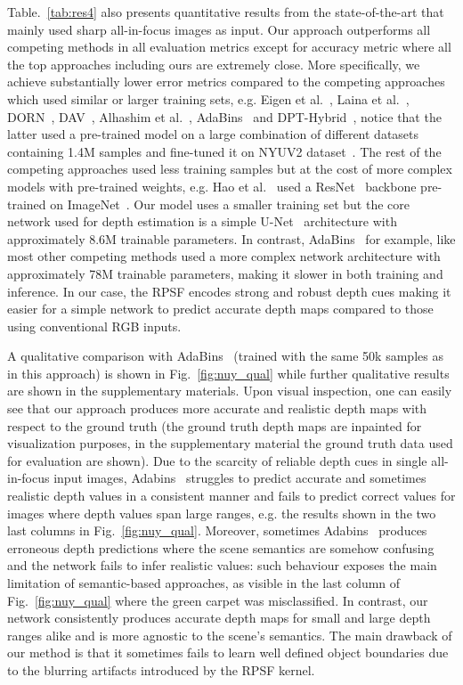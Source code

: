 \documentclass[preprint,5p,twocolumn]{elsarticle}
\begin{document}
Table.~\ref{tab:res4} also presents  quantitative results from the state-of-the-art that mainly used sharp all-in-focus images as input. Our approach outperforms all competing methods in all evaluation metrics except for  accuracy metric where all the top approaches including ours are extremely close. More specifically, we achieve substantially lower error metrics compared to the competing approaches which used similar or larger training sets, e.g. Eigen et al.~\cite{eigen2015predicting}, Laina et al.~\cite{laina2016deeper}, DORN~\cite{fu2018deep}, DAV~\cite{huynh2020guiding}, Alhashim et al.~\cite{alhashim2018high},  AdaBins~\cite{bhat2020adabins} and DPT-Hybrid~\cite{ranftl2021vision}, notice that the latter used a pre-trained model on a large combination of different datasets containing 1.4M samples and fine-tuned it on NYUV2 dataset~\cite{eigen2015predicting}. The rest of the competing approaches used less training samples but at the cost of more complex models with pre-trained weights, e.g. Hao et al.~\cite{hao2018detail} used a ResNet~\cite{he2016deep} backbone pre-trained on ImageNet~\cite{deng2009imagenet}.
Our model uses a smaller training set but the core network used for depth estimation is a simple U-Net~\cite{ronneberger2015u} architecture with approximately 8.6M trainable parameters. In contrast, AdaBins~\cite{bhat2020adabins} for example, like most other competing methods used a more complex network architecture with approximately 78M trainable parameters, making it slower in both training and inference. In our case, the RPSF encodes strong and robust depth cues making it easier for a simple network to predict accurate depth maps compared to those using conventional RGB inputs. 

A qualitative comparison with AdaBins~\cite{bhat2020adabins} (trained with the same 50k samples as in this approach) is shown in Fig.~\ref{fig:nuy_qual} while further qualitative results are shown in the supplementary materials. Upon visual inspection, one can easily see that our approach produces more accurate and realistic depth maps with respect to the ground truth (the ground truth depth maps are inpainted for visualization purposes, in the supplementary material the ground truth data used for evaluation are shown). 
Due to the scarcity of reliable depth cues in single all-in-focus input images, Adabins~\cite{bhat2020adabins} struggles to predict accurate and sometimes realistic depth values in a consistent manner and fails to predict correct values for images where depth values span large ranges, e.g. the results shown in the two last columns in Fig.~\ref{fig:nuy_qual}. Moreover, sometimes Adabins~\cite{bhat2020adabins} produces erroneous depth predictions where the scene semantics are somehow confusing and the network fails to infer realistic values: such behaviour exposes the main limitation of semantic-based approaches, as visible in the last column of Fig.~\ref{fig:nuy_qual} where the green carpet was misclassified. In contrast, our network consistently produces accurate depth maps for small and large depth ranges alike and is more agnostic to the scene's semantics. The main drawback of our method is that it sometimes fails to learn well defined object boundaries due to the blurring artifacts introduced by the RPSF kernel. 
\end{document}
